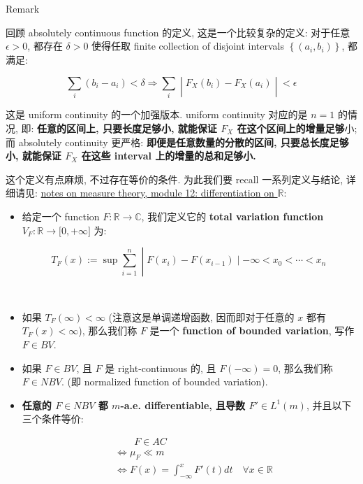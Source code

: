 \documentclass{qlnotes-export}
\begin{document}
\begin{qlremark}{Remark}

回顾 absolutely continuous function 的定义, 这是一个比较复杂的定义: 对于任意 \(\epsilon > 0\), 都存在 \(\delta > 0\) 使得任取 finite collection of disjoint intervals \(\left\{ {(a_{i},b_{i})} \right\}\), 都满足:

\[\left. \sum\limits_{i}(b_{i} - a_{i}) < \delta\Longrightarrow\sum\limits_{i} \middle| F_{X}(b_{i}) - F_{X}(a_{i}) \middle| < \epsilon \right.\]

这是 uniform continuity 的一个加强版本. uniform continuity 对应的是 \(n = 1\) 的情况, 即: \textbf{任意的区间上, 只要长度足够小, 就能保证 \(F_{X}\) 在这个区间上的增量足够}小; 而 absolutely continuity 更严格: \textbf{即便是任意数量的分散的区间, 只要总长度足够小, 就能保证 \(F_{X}\) 在这些 interval 上的增量的总和足够小.}

这个定义有点麻烦, 不过存在等价的条件. 为此我们要 recall 一系列定义与结论, 详细请见: \href{https://qiulinfan.github.io/mathnotes-measure_theory/12-differentiation_on_real_spaces.html}{notes on measure theory, module 12: differentiation on \(\mathbb{R}\)}:

\begin{itemize}
\item
  给定一个 function \(F:{\mathbb{R}}\rightarrow{\mathbb{C}}\), 我们定义它的 \textbf{total variation function} \(V_{F}:{\mathbb{R}}\rightarrow\lbrack 0, + \infty\rbrack\) 为:

  \[\left. T_{F}(x) := \sup\sum\limits_{i = 1}^{n} \middle| F(x_{i}) - F(x_{i - 1}) \mid - \infty < x_{0} < \cdots < x_{n}\  \right.\]

  ~
\item
  如果 \(T_{F}(\infty) < \infty\) (注意这是单调递增函数, 因而即对于任意的 \(x\) 都有 \(T_{F}(x) < \infty\)), 那么我们称 \(F\) 是一个 \textbf{function of bounded variation}, 写作 \(F \in BV\).
\item
  如果 \(F \in BV\), 且 \(F\) 是 right-continuous 的, 且 \(F( - \infty) = 0\), 那么我们称 \(F \in NBV\). (即 normalized function of bounded variation).
\item
  \textbf{任意的 \(F \in NBV\) 都 \(m\)-a.e. differentiable, 且导数 \(F' \in L^{1}(m)\)}, 并且以下三个条件等价:

  \[\begin{matrix}
   & {\quad\quad F \in AC} \\
   & {\Leftrightarrow\mu_{F} \ll m} \\
   & {\Leftrightarrow F(x) = \int_{- \infty}^{x}F'(t) dt\quad\forall x \in {\mathbb{R}}}
  \end{matrix}\]
\end{itemize}

\end{qlremark}
\end{document}
